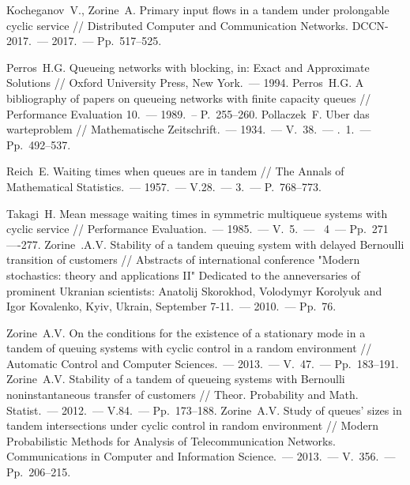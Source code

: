 \documentclass{report}
\newcommand{\No}{\textnumero}
\begin{document}
\begin{thebibliography}{99}
  Kocheganov~V., Zorine~A. Primary input flows in a tandem under prolongable cyclic service // Distributed Computer and Communication Networks. DCCN-2017.~--- 2017.~--- Pp.~517--525.

 
 Perros~H.G.  Queueing networks with blocking, in: Exact and Approximate Solutions // Oxford University Press, New York.~--- 1994.
 Perros~H.G. A bibliography of papers on queueing networks with finite capacity queues // Performance Evaluation 10.~--- 1989.~-- P.~255–260.
 Pollaczek~F. Uber das warteproblem // Mathematische Zeitschrift.~--- 1934.~--- V.~38.~--- \No{}.~1.~--- Pp.~492--537.

 Reich~E.  Waiting times when queues are in tandem // The Annals of Mathematical Statistics.~--- 1957.~--- V.28.~--- \No{}3.~--- P.~768--773.

 Takagi~H. Mean message waiting times in symmetric multiqueue systems with cyclic service // Performance Evaluation.~--- 1985.~--- V.~5.~--- \No{}~4~--- Pp.~271—-277.  
 Zorine~.A.V. Stability of a tandem queuing system with delayed Bernoulli transition of customers // Abstracts of international conference "Modern stochastics: theory and applications II" Dedicated to the anneversaries of prominent Ukranian scientists: Anatolij Skorokhod, Volodymyr Korolyuk and Igor Kovalenko, Kyiv, Ukrain, September 7-11.~--- 2010.~--- Pp.~76.

 Zorine~A.V. On the conditions for the existence of a stationary mode in a tandem of queuing systems with cyclic control in a random environment // Automatic Control and Computer Sciences.~--- 2013.~--- V.~47.~--- Pp.~183--191.
 Zorine~A.V. Stability of a tandem of queueing systems with Bernoulli noninstantaneous transfer of customers // Theor. Probability and Math. Statist.~--- 2012.~--- V.84.~--- Pp.~173--188.
 Zorine~A.V. Study of queues’ sizes in tandem intersections under cyclic control in random environment // Modern Probabilistic Methods for Analysis of Telecommunication Networks. Communications in Computer and Information Science.~--- 2013.~--- V.~356.~--- Pp.~206--215.

\end{thebibliography}
\end{document}

